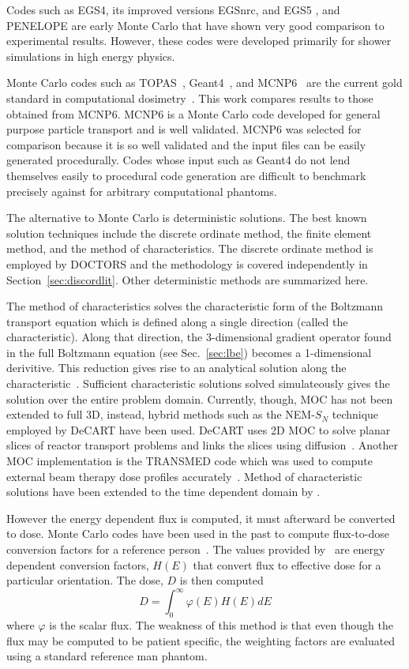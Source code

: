 Codes such as EGS4, its improved versions EGSnrc, and EGS5 \citep{ref:nelsonw}, and PENELOPE \citep{ref:salvatf} are early Monte Carlo that have shown very good comparison to experimental results. However, these codes were developed primarily for shower simulations in high energy physics.

Monte Carlo codes such as TOPAS~\citep{ref:perlj}, Geant4~\citep{ref:agostinellis}, and MCNP6~\citep{ref:mcnp6} are the current gold standard in computational dosimetry~\citep{ref:jiax}. This work compares results to those obtained from MCNP6. MCNP6 is a Monte Carlo code developed for general purpose particle transport and is well validated. MCNP6 was selected for comparison because it is so well validated and the input files can be easily generated procedurally. Codes whose input such as Geant4 do not lend themselves easily to procedural code generation are difficult to benchmark precisely against for arbitrary computational phantoms.

The alternative to Monte Carlo is deterministic solutions. The best known solution techniques include the discrete ordinate method, the finite element method, and the method of characteristics. The discrete ordinate method is employed by DOCTORS and the methodology is covered independently in Section~\ref{sec:discordlit}. Other deterministic methods are summarized here.

The method of characteristics solves the characteristic form of the Boltzmann transport equation which is defined along a single direction (called the characteristic). Along that direction, the 3-dimensional gradient operator found in the full Boltzmann equation (see Sec.~\ref{sec:lbe}) becomes a 1-dimensional derivitive. This reduction gives rise to an analytical solution along the characteristic~\citep{ref:askewj}. Sufficient characteristic solutions solved simulateously gives the solution over the entire problem domain. Currently, though, MOC has not been extended to full 3D, instead, hybrid methods such as the NEM-$S_N$ technique employed by DeCART have been used. DeCART uses 2D MOC to solve planar slices of reactor transport problems and links the slices using diffusion~\citep{ref:hursinm}. Another MOC implementation is the TRANSMED code which was used to compute external beam therapy dose profiles accurately~\citep{ref:williamsm}. Method of characteristic solutions have been extended to the time dependent domain by \citet{ref:hoffmana}.

However the energy dependent flux is computed, it must afterward be converted to dose. Monte Carlo codes have been used in the past to compute flux-to-dose conversion factors for a reference person~\citep{ref:icrp116}. The values provided by~\citet{ref:icrp116} are energy dependent conversion factors, $H(E)$ that convert flux to effective dose for a particular orientation. The dose, $D$ is then computed
\begin{equation}
D = \int_0^\infty \varphi(E) H(E) dE
\end{equation}
where $\varphi$ is the scalar flux. The weakness of this method is that even though the flux may be computed to be patient specific, the weighting factors are evaluated using a standard reference man phantom.

